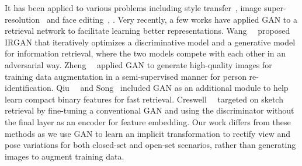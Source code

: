\documentclass[runningheads]{llncs}
\begin{document}
It has been applied to various problems including style transfer~\cite{DBLP:conf/eccv/YooKPPK16,pix2pix2016,DBLP:journals/corr/ZhuPIE17,DBLP:journals/corr/LiuBK17}, image super-resolution~\cite{ledig2016photo,DBLP:journals/corr/Wu0ZH17} and face editing~\cite{DBLP:journals/corr/ShuYHSSS17}, \etc. 
Very recently, a few works have applied GAN to a retrieval network to facilitate learning better representations. 
Wang~\etal~\cite{DBLP:conf/sigir/WangYZGXWZZ17} proposed IRGAN that iteratively optimizes a discriminative model and a generative model for information retrieval, where the two models compete with each other in an adversarial way.
Zheng~\etal~\cite{DBLP:journals/corr/ZhengZY17} applied GAN to generate high-quality images for training data augmentation in a semi-supervised manner for person re-identification.
Qiu~\etal~\cite{DBLP:conf/sigir/QiuPYM17} and Song~\cite{DBLP:journals/corr/abs-1708-04150} included GAN as an additional module to help learn compact binary features for fast retrieval. 
Creswell~\etal~\cite{DBLP:conf/eccv/CreswellB16} targeted on sketch retrieval by fine-tuning a conventional GAN and using the discriminator without the final layer as an encoder for feature embedding.
Our work differs from these methods as we use GAN to learn an implicit transformation to rectify view and pose variations for both closed-set and open-set scenarios, rather than generating images to augment training data. 
\end{document}
